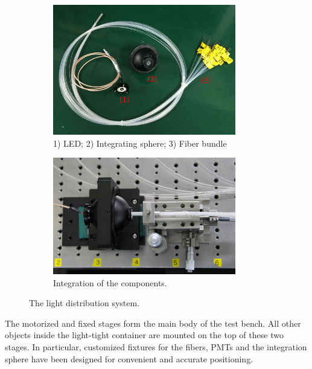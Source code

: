 \documentclass{nst}
\providecommand{\DIFadd}[1]{{\protect\color{yellow} #1}} %
\providecommand{\DIFaddbegin}{} %
\providecommand{\DIFaddend}{} %
\providecommand{\DIFdelbegin}{} %
\providecommand{\DIFdelend}{} %
\begin{document}
\begin{figure}[!htb]

	\begin{subfigure}[t]{80mm}
		\includegraphics[width=80mm]{FIG3_a.jpg}
		\caption{1) LED; 2) Integrating sphere; 3) Fiber bundle}
		\label{fig:FIG3_a}
	\end{subfigure}
	\begin{subfigure}[t]{80mm}
		\includegraphics[width=80mm]{FIG3_b.jpg}
		\caption{Integration of the components.}
		\label{fig:FIG3_b}
	\end{subfigure}

	\caption{The light distribution system.}
	\label{fig:FIG3}
\end{figure}

The motorized and fixed stages form the main body of the test bench.
All other objects inside the light-tight container are mounted on the top of \DIFdelbegin \DIFdelend \DIFaddbegin \DIFadd{these two stages}\DIFaddend .
In particular, customized fixtures for the fibers, PMTs and the integration sphere have been designed for convenient and accurate positioning.

\end{document}
